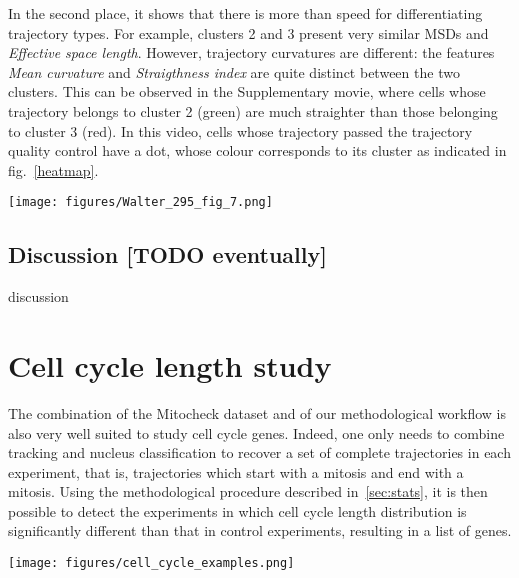 In the second place, it shows that there is more than speed for differentiating trajectory types. For example, clusters 2 and 3 present very similar MSDs and \textit{Effective space length}. However, trajectory curvatures are different: the features \textit{Mean curvature} and \textit{Straigthness index} are quite distinct between the two clusters. This can be observed in the Supplementary movie, where cells whose trajectory belongs to cluster 2 (green) are much straighter than those belonging to cluster 3 (red). In this video, cells whose trajectory passed the trajectory quality control have a dot, whose colour corresponds to its cluster as indicated in fig.~\ref{heatmap}.

\begin{figure*}[t!]
\centerline{\texttt{[image: figures/Walter\_295\_fig\_7.png]}}
\caption{Characterization of our ontology of trajectories. Each column is a single cell trajectory ; trajectories are grouped by cluster label. 1,000 trajectories were randomly selected per trajectory cluster.}
\label{heatmap}
\end{figure*}
\subsection{Discussion [TODO eventually]}
discussion\clearpage
\section{Cell cycle length study}
\label{sec:cellcycle}
The combination of the Mitocheck dataset and of our methodological workflow is also very well suited to study cell cycle genes. Indeed, one only needs to combine tracking and nucleus classification to recover a set of complete trajectories in each experiment, that is, trajectories which start with a mitosis and end with a mitosis. Using the methodological procedure described in~\ref{sec:stats}, it is then possible to detect the experiments in which cell cycle length distribution is significantly different than that in control experiments, resulting in a list of genes.
\begin{figure*}[ht!]
\centerline{\texttt{[image: figures/cell\_cycle\_examples.png]}}
\caption{Examples of object divisions from the Mitocheck dataset}
\label{cellcycle2}
\end{figure*}

